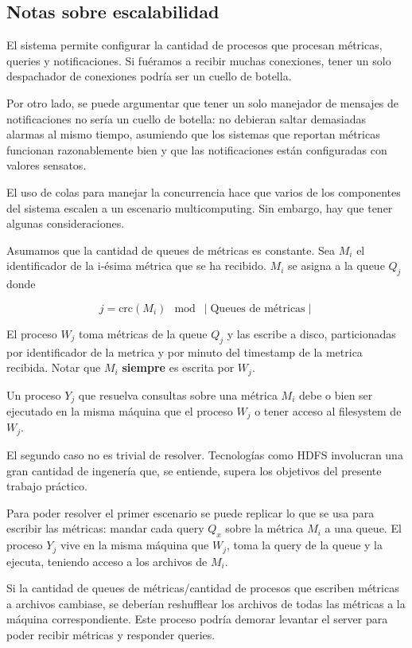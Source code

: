 \documentclass[a4paper,oneside]{article}
\begin{document}
\subsection{Notas sobre escalabilidad}
El sistema permite configurar la cantidad de procesos que procesan métricas, queries y notificaciones. Si fuéramos a recibir muchas conexiones, tener un solo despachador de conexiones podría ser un cuello de botella.

Por otro lado, se puede argumentar que tener un solo manejador de mensajes de notificaciones no sería un cuello de botella: no debieran saltar demasiadas alarmas al mismo tiempo, asumiendo que los sistemas que reportan métricas funcionan razonablemente bien y que las notificaciones están configuradas con valores sensatos.

El uso de colas para manejar la concurrencia hace que varios de los componentes del sistema escalen a un escenario multicomputing. Sin embargo, hay que tener algunas consideraciones.

Asumamos que la cantidad de queues de métricas es constante. Sea $M_i$ el identificador de la i-ésima métrica que se ha recibido. $M_i$ se asigna a la queue $Q_j$ donde

\begin{equation}\label{crcindex}
	j = \text{crc}(M_i) \mod \mid \text{Queues de métricas} \mid
\end{equation}

El proceso $W_j$ toma métricas de la queue $Q_j$ y las escribe a disco, particionadas por identificador de la metrica y por minuto del timestamp de la metrica recibida. Notar que $M_i$ \textbf{siempre} es escrita por $W_j$.

Un proceso $Y_j$ que resuelva consultas sobre una métrica $M_i$ debe o bien ser ejecutado en la misma máquina que el proceso $W_j$ o tener acceso al filesystem de $W_j$.

El segundo caso no es trivial de resolver. Tecnologías como HDFS\cite{HDFS} involucran una gran cantidad de ingenería que, se entiende, supera los objetivos del presente trabajo práctico.

Para poder resolver el primer escenario se puede replicar lo que se usa para escribir las métricas: mandar cada query $Q_x$ sobre la métrica $M_i$ a una queue. El proceso $Y_j$ vive en la misma máquina que $W_j$, toma la query de la queue y la ejecuta, teniendo acceso a los archivos de $M_i$.

Si la cantidad de queues de métricas/cantidad de procesos que escriben métricas a archivos cambiase, se deberían reshufflear los archivos de todas las métricas a la máquina correspondiente. Este proceso podría demorar levantar el server para poder recibir métricas y responder queries.
\end{document}
